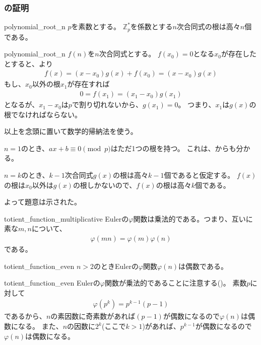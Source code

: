\subsubsection{の証明}
\begin{Prop}{}{polynomial_root_n}
$p$を素数とする。
$\mathbb{Z}_p^*$を係数とする$n$次合同式の根は高々$n$個である。
\end{Prop}

\begin{prProof}{polynomial_root_n}
$f(n)$を$n$次合同式とする。
$f(x_0)=0$となる$x_0$が存在したとすると、より
\begin{align*}
f(x) = (x-x_0)g(x) + f(x_0) = (x-x_0)g(x)
\end{align*}
もし、$x_0$以外の根$x_1$が存在すれば
\begin{align*}
0 = f(x_1) = (x_1-x_0)g(x_1)
\end{align*}
となるが、$x_1-x_0$は$p$で割り切れないから、$g(x_1)=0$。
つまり、$x_1$は$g(x)$の根でなければならない。

以上を念頭に置いて数学的帰納法を使う。

$n=1$のとき、$ax+b\equiv0\pmod{p}$はただ1つの根を持つ。
これは、からも分かる。

$n=k$のとき、$k-1$次合同式$g(x)$の根は高々$k-1$個であると仮定する。
$f(x)$の根は$x_0$以外は$g(x)$の根しかないので、$f(x)$の根は高々$k$個である。

よって題意は示された。
\end{prProof}

\begin{Lemm}{}{totient_function_multiplicative}
Eulerの$\varphi$関数は乗法的である。つまり、互いに素な$m,n$について、
\begin{align*}
\varphi(mn) = \varphi(m)\varphi(n)
\end{align*}
である。
\end{Lemm}

\begin{Lemm}{}{totient_function_even}
$n>2$のときEulerの$\varphi$関数$\varphi(n)$は偶数である。
\end{Lemm}

\begin{lmProof}{totient_function_even}
Eulerの$\varphi$関数が乗法的であることに注意する()。
素数$p$に対して
\begin{align*}
\varphi(p^k) = p^{k-1}(p-1)
\end{align*}
であるから、$n$の素因数に奇素数があれば$(p-1)$が偶数になるので$\varphi(n)$は偶数になる。
また、$n$の因数に$2^k$(ここで$k>1$)があれば、$p^{k-1}$が偶数になるので$\varphi(n)$は偶数になる。
\end{lmProof}


